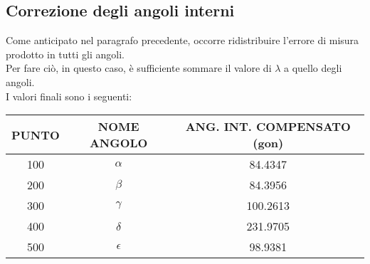 \subsection{Correzione degli angoli interni}
Come anticipato nel paragrafo precedente, occorre ridistribuire l'errore di misura prodotto in tutti gli angoli.\\
Per fare ciò, in questo caso, è sufficiente sommare il valore di $\lambda$ a quello degli angoli.\\
I valori finali sono i seguenti:
\begin{table}[H] \centering
\begin{tabular}{ccc}
\toprule
PUNTO & NOME ANGOLO             & ANG. INT. COMPENSATO (gon) \\
\midrule
100   & $\alpha$   & 84.4347                    \\
200   & $\beta$    & 84.3956                    \\
300   & $\gamma$   & 100.2613                   \\
400   & $\delta$   & 231.9705                   \\
500   & $\epsilon$ & 98.9381                    \\
\midrule
\end{tabular}
\end{table}

